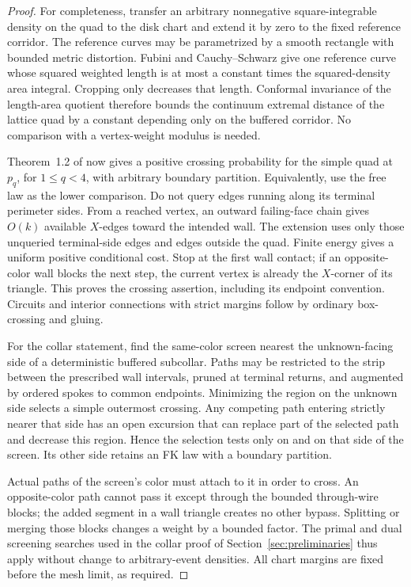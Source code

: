 \begin{proof}
For completeness, transfer an arbitrary nonnegative square-integrable
density on the quad to the disk chart and extend it by zero to the
fixed reference corridor.  The reference curves may be parametrized
by a smooth rectangle with bounded metric distortion.  Fubini and
Cauchy--Schwarz give one reference curve whose squared weighted length
is at most a constant times the squared-density area integral.
Cropping only decreases that length.  Conformal invariance of the
length-area quotient therefore bounds the continuum extremal distance
of the lattice quad by a constant depending only on the buffered
corridor.  No comparison with a vertex-weight modulus is needed.

Theorem~1.2 of \citet{DMT2021Fractal} now gives a positive crossing
probability for the simple quad at $p_q$, for $1\le q<4$, with arbitrary
boundary partition.  Equivalently, use the free law as the lower
comparison.  Do not query edges running along its terminal perimeter
sides.  From a reached vertex, an outward failing-face chain gives
$O(k)$ available $X$-edges toward the intended wall.  The extension
uses only those unqueried terminal-side edges and edges outside the
quad.  Finite energy gives a uniform positive conditional cost.  Stop
at the first wall contact; if an opposite-color wall blocks the next
step, the current vertex is already the $X$-corner of its triangle.
This proves the crossing assertion, including its endpoint convention.
Circuits and interior connections with strict margins follow by
ordinary box-crossing and gluing.

For the collar statement, find the same-color screen nearest the
unknown-facing side of a deterministic buffered subcollar.  Paths may
be restricted to the strip between the prescribed wall intervals,
pruned at terminal returns, and augmented by ordered spokes to common
endpoints.  Minimizing the region on the unknown side selects a
simple outermost crossing.  Any competing path entering strictly
nearer that side has an open excursion that can replace part of the
selected path and decrease this region.  Hence the selection tests
only on and on that side of the screen.  Its other side retains an
FK law with a boundary partition.

Actual paths of the screen's color must attach to it in order to cross.
An opposite-color path cannot pass it except through the bounded
through-wire blocks; the added segment in a wall triangle creates no
other bypass.  Splitting or merging those blocks changes a weight by
a bounded factor.  The primal and dual screening searches used in the
collar proof of Section~\ref{sec:preliminaries} thus apply without
change to arbitrary-event densities.  All chart margins are fixed
before the mesh limit, as required.
\end{proof}

